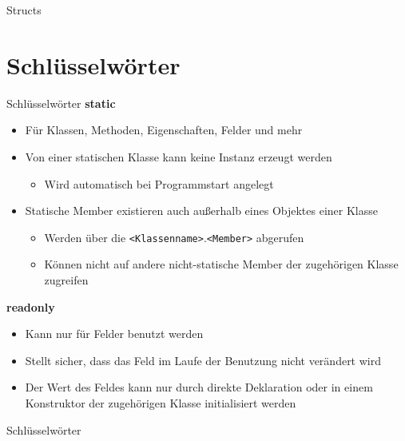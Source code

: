 \begin{frame}{Structs}
	
	
\end{frame}

\section{Schlüsselwörter}
\begin{frame}{Schlüsselwörter}
	\textbf{static}\\
	\begin{itemize}
		\item Für Klassen, Methoden, Eigenschaften, Felder und mehr
		\item Von einer statischen Klasse kann keine Instanz erzeugt werden
		\begin{itemize}
			\item Wird automatisch bei Programmstart angelegt
		\end{itemize}
		\item Statische Member existieren auch außerhalb eines Objektes einer Klasse 
		\begin{itemize}
			\item Werden über die \texttt{\alert{<Klassenname>}}.\texttt{\alert{<Member>}} abgerufen
			\item Können nicht auf andere nicht-statische Member der zugehörigen Klasse zugreifen
		\end{itemize}
	\end{itemize}
	\textbf{readonly}\\
	\begin{itemize}
		\item Kann nur für Felder benutzt werden
		\item Stellt sicher, dass das Feld im Laufe der Benutzung nicht verändert wird
		\item Der Wert des Feldes kann nur durch direkte Deklaration oder in einem Konstruktor der zugehörigen Klasse initialisiert werden
	\end{itemize}
\end{frame}

\begin{frame}{Schlüsselwörter}
	
\end{frame}

